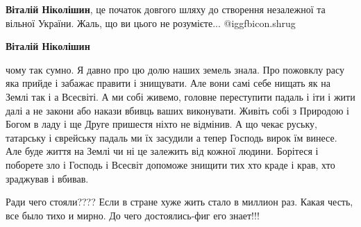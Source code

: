 \begin{itemize} %
\textbf{Віталій Ніколішин}, це початок довгого шляху до створення незалежної та
вільної України. Жаль, що ви цього не розумієте... @igg{fbicon.shrug} 

\textbf{Віталій Ніколішин} 

чому так сумно. Я давно про цю долю наших земель знала. Про пожовклу расу яка
прийде і забажає правити і знищувати. Але вони самі себе нищать як на Землі так
і а Всесвіті. А ми собі живемо, головне переступити падаль і іти і жити далі а
не закони або накази вбивць ваших виконувати. Живіть собі з Природою і Богом в
ладу і ще Друге пришестя ніхто не відмінив. А що чекає руську, татарську і
єврейську падаль ми їх засудили а тепер Господь вирок їм винесе. Але буде життя
на Землі чи ні це залежить від кожної людини. Борітеся і поборете зло і Господь
і Всесвіт допоможе знищити тих хто краде і крав, хто зраджував і вбивав.

\end{itemize} %


Ради чего стояли???? Если в стране хуже жить стало в миллион раз. Какая честь, все
было тихо и мирно. До чего достоялись-фиг его знает!!!

